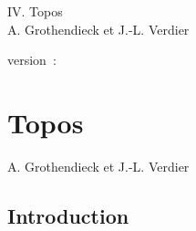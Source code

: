 \documentclass[10pt]{../fichiers-configuration-latex/smfart}
\begin{document}
\begin{center}
IV. Topos\\
A. Grothendieck et J.-L. Verdier
\end{center}

version : \showgitstatus{}
\tableofcontents

\else
\chapter{Topos}
\begin{center}
A. Grothendieck et J.-L. Verdier
\end{center}
\fi

\setcounter{pageoriginal}{298}
\setcounter{section}{-1}
\section{Introduction}\pageoriginale
\end{document}
